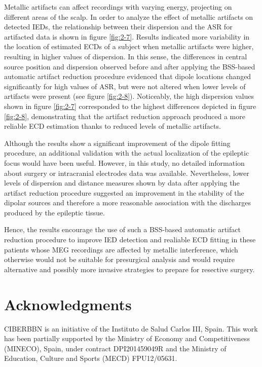 Metallic artifacts can affect recordings with varying energy, projecting on different areas of the scalp. In order to analyze the effect of metallic artifacts on detected IEDs, the relationship between their dispersion and the ASR for artifacted data is shown in figure \ref{fig:2-7}. Results indicated more variability in the location of estimated ECDs of a subject when metallic artifacts were higher, resulting in higher values of dispersion. In this sense, the differences in central source position and dispersion observed before and after applying the BSS-based automatic artifact reduction procedure evidenced that dipole locations changed significantly for high values of ASR, but were not altered when lower levels of artifacts were present (see figure \ref{fig:2-8}). Noticeably, the high dispersion values shown in figure \ref{fig:2-7} corresponded to the highest differences depicted in figure \ref{fig:2-8}, demonstrating that the artifact reduction approach produced a more reliable ECD estimation thanks to reduced levels of metallic artifacts.

Although the results show a significant improvement of the dipole fitting procedure, an additional validation with the actual localization of the epileptic focus would have been useful. However, in this study, no detailed information about surgery or intracranial electrodes data was available. Nevertheless, lower levels of dispersion and distance measures shown by data after applying the artifact reduction procedure suggested an improvement in the stability of the dipolar sources and therefore a more reasonable association with the discharges produced by the epileptic tissue.

Hence, the results encourage the use of such a BSS-based automatic artifact reduction procedure to improve IED detection and realiable ECD fitting in these patients whose MEG recordings are affected by metallic interference, which otherwise would not be suitable for presurgical analysis and would require alternative and possibly more invasive strategies to prepare for resective surgery.

\section{Acknowledgments}

CIBERBBN is an initiative of the Instituto de Salud Carlos III, Spain. This work has been partially supported by the Ministry of Economy and Competitiveness (MINECO), Spain, under contract DPI201459049R and the Ministry of Education, Culture and Sports (MECD) FPU12/05631.
